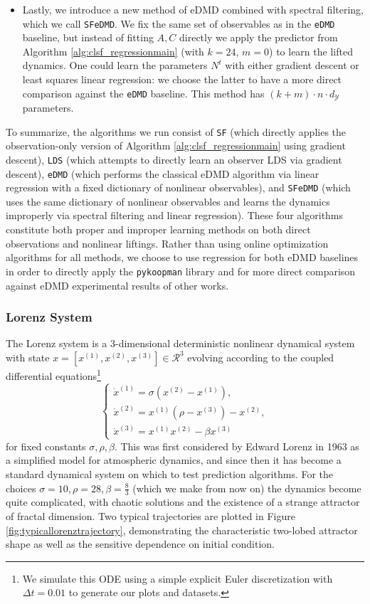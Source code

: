 \documentclass[11pt]{article}
\def\R{{\mathcal R}}
\def\R{\ensuremath{\mathcal R}}
\numberwithin{equation}{section}
\begin{document}
\begin{itemize}
    \item Lastly, we introduce a new method of eDMD combined with spectral filtering, which we call \verb|SFeDMD|. We fix the same set of observables as in the \verb|eDMD| baseline, but instead of fitting $A, C$ directly we apply the predictor from Algorithm \ref{alg:clsf_regressionmain} (with $k=24$, $m=0$) to learn the lifted dynamics. One could learn the parameters $N^t$ with either gradient descent or least squares linear regression: we choose the latter to have a more direct comparison against the \verb|eDMD| baseline. This method has $(k+m)\cdot n \cdot d_\mathcal{Y}$ parameters.
\end{itemize}

To summarize, the algorithms we run consist of \verb|SF| (which directly applies the observation-only version of Algorithm \ref{alg:clsf_regressionmain} using gradient descent), \verb|LDS| (which attempts to directly learn an observer LDS via gradient descent), \verb|eDMD| (which performs the classical eDMD algorithm via linear regression with a fixed dictionary of nonlinear observables), and \verb|SFeDMD| (which uses the same dictionary of nonlinear observables and learns the dynamics improperly via spectral filtering and linear regression). These four algorithms constitute both proper and improper learning methods on both direct observations and nonlinear liftings. Rather than using online optimization algorithms for all methods, we choose to use regression for both eDMD baselines in order to directly apply the \verb|pykoopman| library and for more direct comparison against eDMD experimental results of other works.



\subsubsection{Lorenz System}

The Lorenz system is a 3-dimensional deterministic nonlinear dynamical system with state $x = [x^{(1)}, x^{(2)}, x^{(3)}] \in \R^3$ evolving according to the coupled differential equations\footnote{We simulate this ODE using a simple explicit Euler discretization with $\Delta t = 0.01$ to generate our plots and datasets.}
$$\begin{cases}
    \dot{x}^{(1)} = \sigma(x^{(2)} - x^{(1)}), \\
    \dot{x}^{(2)} = x^{(1)}(\rho - x^{(3)}) - x^{(2)}, \\
    \dot{x}^{(3)} = x^{(1)} x^{(2)} - \beta x^{(3)}
    \end{cases}$$
    for fixed constants $\sigma, \rho, \beta$. This was first considered by Edward Lorenz in 1963 as a simplified model for atmospheric dynamics, and since then it has become
a standard dynamical system on which to test prediction algorithms. For the choices $\sigma = 10, \rho = 28, \beta = \frac{8}{3}$ (which we make from now on) the dynamics become quite complicated, with chaotic solutions and the existence of a strange attractor of fractal dimension. Two typical trajectories are plotted in Figure \ref{fig:typicallorenztrajectory}, demonstrating the characteristic two-lobed attractor shape as well as the sensitive dependence on initial condition.
\end{document}
